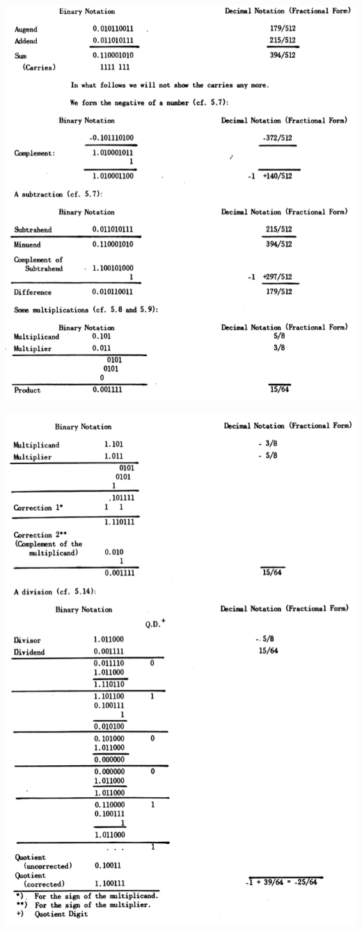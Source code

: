 \documentclass[12pt]{amsart}
\begin{document}
\includegraphics[width=160 mm]{Fig1-a}

\includegraphics[width=160 mm]{Fig1-b}
\end{document}
